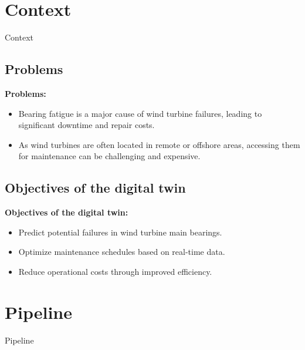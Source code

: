\documentclass[aspectratio=169,xcolor=dvipsnames]{beamer}
\begin{document}
\section{Context}
\begin{frame}{Context}
    \subsection{Problems}
    \textbf{Problems:}
    \begin{itemize}
        \item Bearing fatigue is a major cause of wind turbine failures, leading to significant downtime and repair costs.
        \item As wind turbines are often located in remote or offshore areas, accessing them for maintenance can be challenging and expensive.
    \end{itemize}
    \vfill

    \subsection{Objectives of the digital twin}
    \textbf{Objectives of the digital twin:}
    \begin{itemize}
        \item Predict potential failures in wind turbine main bearings.
        \item Optimize maintenance schedules based on real-time data.
        \item Reduce operational costs through improved efficiency.
    \end{itemize}
\end{frame}


\section{Pipeline}
\begin{frame}{Pipeline}
\vfill
\centering
{}
\vfill
\end{frame}
\end{document}
